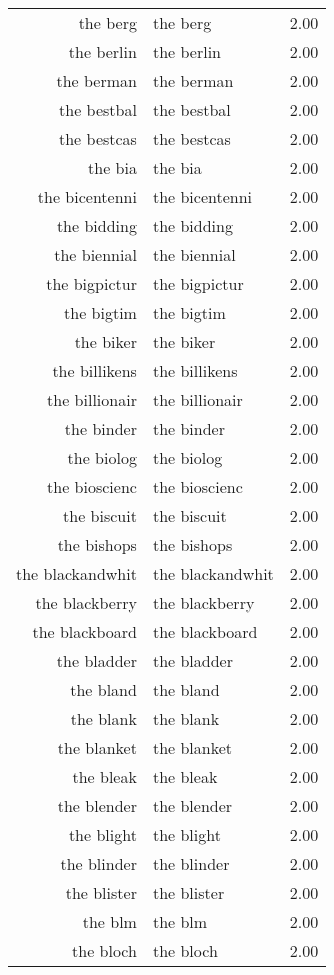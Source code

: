 \begin{table}[ht]
\begin{tabular}{rlr}
  the berg & the berg & 2.00 \\ 
  the berlin & the berlin & 2.00 \\ 
  the berman & the berman & 2.00 \\ 
  the bestbal & the bestbal & 2.00 \\ 
  the bestcas & the bestcas & 2.00 \\ 
  the bia & the bia & 2.00 \\ 
  the bicentenni & the bicentenni & 2.00 \\ 
  the bidding & the bidding & 2.00 \\ 
  the biennial & the biennial & 2.00 \\ 
  the bigpictur & the bigpictur & 2.00 \\ 
  the bigtim & the bigtim & 2.00 \\ 
  the biker & the biker & 2.00 \\ 
  the billikens & the billikens & 2.00 \\ 
  the billionair & the billionair & 2.00 \\ 
  the binder & the binder & 2.00 \\ 
  the biolog & the biolog & 2.00 \\ 
  the bioscienc & the bioscienc & 2.00 \\ 
  the biscuit & the biscuit & 2.00 \\ 
  the bishops & the bishops & 2.00 \\ 
  the blackandwhit & the blackandwhit & 2.00 \\ 
  the blackberry & the blackberry & 2.00 \\ 
  the blackboard & the blackboard & 2.00 \\ 
  the bladder & the bladder & 2.00 \\ 
  the bland & the bland & 2.00 \\ 
  the blank & the blank & 2.00 \\ 
  the blanket & the blanket & 2.00 \\ 
  the bleak & the bleak & 2.00 \\ 
  the blender & the blender & 2.00 \\ 
  the blight & the blight & 2.00 \\ 
  the blinder & the blinder & 2.00 \\ 
  the blister & the blister & 2.00 \\ 
  the blm & the blm & 2.00 \\ 
  the bloch & the bloch & 2.00 \\ 

\end{tabular}
\end{table}
